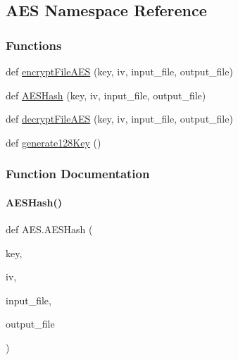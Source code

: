 \hypertarget{namespace_a_e_s}{}\subsection{A\+ES Namespace Reference}
\label{namespace_a_e_s}
\subsubsection*{Functions}
\begin{DoxyCompactItemize}
\item 
def \hyperlink{namespace_a_e_s_a7960ab3a0ea97aa4b6f1fc0afc20dca1}{encrypt\+File\+A\+ES} (key, iv, input\+\_\+file, output\+\_\+file)
\item 
def \hyperlink{namespace_a_e_s_a49c0fbfb25434be34ff870485bbe6f14}{A\+E\+S\+Hash} (key, iv, input\+\_\+file, output\+\_\+file)
\item 
def \hyperlink{namespace_a_e_s_a0f25156df9811fb70450858515e1e8d8}{decrypt\+File\+A\+ES} (key, iv, input\+\_\+file, output\+\_\+file)
\item 
def \hyperlink{namespace_a_e_s_a2f6be75a38509168dbd3b6b24bc919f7}{generate128\+Key} ()
\end{DoxyCompactItemize}


\subsubsection{Function Documentation}
\mbox{\label{namespace_a_e_s_a49c0fbfb25434be34ff870485bbe6f14}} 
\paragraph{\texorpdfstring{A\+E\+S\+Hash()}{AESHash()}}
{\footnotesize\ttfamily def A\+E\+S.\+A\+E\+S\+Hash (\begin{DoxyParamCaption}\item[{}]{key,  }\item[{}]{iv,  }\item[{}]{input\+\_\+file,  }\item[{}]{output\+\_\+file }\end{DoxyParamCaption})}

\mbox{\label{namespace_a_e_s_a0f25156df9811fb70450858515e1e8d8}} 
